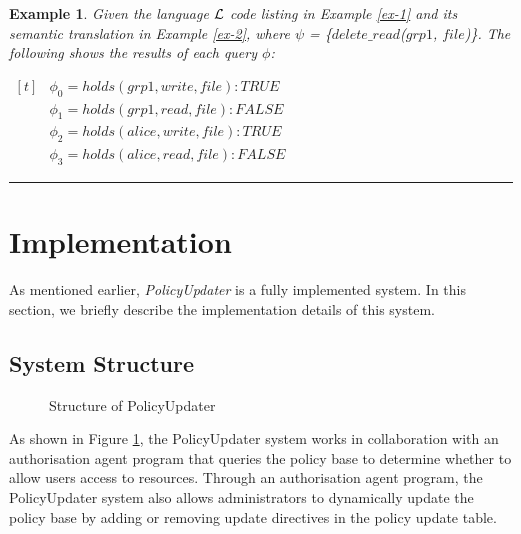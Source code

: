 \documentclass[11pt, twocolumn]{article}
\newtheorem{vexmpl}{Example}
\newenvironment{vexample}
  {\begin{vexmpl}\rm}
  {\rule{2mm}{2mm}\end{vexmpl}}
\newenvironment{vquote}
  {\begin{list}{}{\leftmargin 1em}\item[]}
  {\end{list}}
\begin{document}
    \begin{vexample}
      \label{ex-3}
      Given the language ${\cal L}$ code listing in Example \ref{ex-1} and its
      semantic translation in Example \ref{ex-2}, where $\psi$ =
      \{$delete\_read$($grp1$, $file$)\}. The following shows the
      results of each query $\phi$:

      \begin{vquote}
        \begin{math}
          \begin{aligned}[t]
            &\phi_{0} = holds(grp1, write, file) : TRUE \\
            &\phi_{1} = holds(grp1, read, file) : FALSE \\
            &\phi_{2} = holds(alice, write, file) : TRUE \\
            &\phi_{3} = holds(alice, read, file) : FALSE
          \end{aligned}
        \end{math}
      \end{vquote}
    \end{vexample}

  \section{Implementation}
    \label{sec-implement}

    As mentioned earlier, {\em PolicyUpdater} is a fully implemented system.
    In this section, we briefly describe the implementation details of this
    system.

    \subsection{System Structure}

    \begin{figure}[ht]
      \begin{center}
        \caption{Structure of PolicyUpdater}
        \label{fig-1}
      \end{center}
    \end{figure}

      As shown in Figure \ref{fig-1}, the PolicyUpdater system works in
      collaboration with an authorisation agent program that queries the
      policy base to determine whether to allow users access to resources.
      Through an authorisation agent program, the PolicyUpdater system also
      allows administrators to dynamically update the policy base by adding
      or removing update directives in the policy update table.
\end{document}
